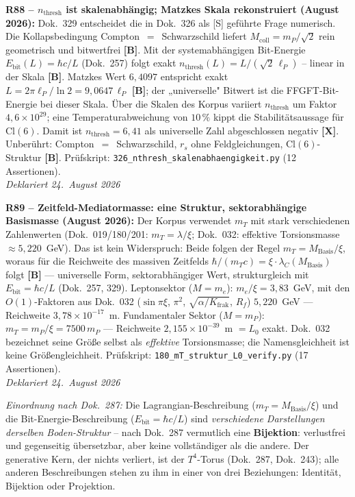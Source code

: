 \textbf{R88 -- $n_{\mathrm{thresh}}$ ist skalenabhängig; Matzkes Skala rekonstruiert (August 2026):}
Dok.~329 entscheidet die in Dok.~326 als [S] geführte Frage numerisch.
Die Kollapsbedingung Compton~$=$~Schwarzschild liefert $M_{\mathrm{coll}} = m_P/\sqrt{2}$ rein geometrisch und bitwertfrei \textbf{[B]}.
Mit der systemabhängigen Bit-Energie $E_{\mathrm{bit}}(L) = \hbar c/L$ (Dok.~257) folgt exakt $n_{\mathrm{thresh}}(L) = L/(\sqrt{2}\,\ell_P)$ -- linear in der Skala \textbf{[B]}.
Matzkes Wert $6{,}4097$ entspricht exakt $L = 2\pi\ell_P/\ln 2 = 9{,}0647\,\ell_P$ \textbf{[B]}; der „universelle" Bitwert ist die FFGFT-Bit-Energie bei dieser Skala.
Über die Skalen des Korpus variiert $n_{\mathrm{thresh}}$ um Faktor $4{,}6\times10^{29}$; eine Temperaturabweichung von $10\,\%$ kippt die Stabilitätsaussage für $\mathrm{Cl}(6)$.
Damit ist $n_{\mathrm{thresh}} = 6{,}41$ als universelle Zahl abgeschlossen negativ \textbf{[X]}.
Unberührt: Compton~$=$~Schwarzschild, $r_s$ ohne Feldgleichungen, $\mathrm{Cl}(6)$-Struktur \textbf{[B]}.
Prüfskript: \texttt{326\_nthresh\_skalenabhaengigkeit.py} (12 Assertionen).\\
\emph{Deklariert 24.~August 2026}

\medskip

\textbf{R89 -- Zeitfeld-Mediatormasse: eine Struktur, sektorabh\"angige Basismasse (August 2026):}
Der Korpus verwendet $m_T$ mit stark verschiedenen Zahlenwerten (Dok.~019/180/201: $m_T = \lambda/\xi$; Dok.~032: effektive Torsionsmasse $\approx 5{,}220$~GeV). Das ist kein Widerspruch: Beide folgen der Regel $m_T = M_\mathrm{Basis}/\xi$, woraus f\"ur die Reichweite des massiven Zeitfelds $\hbar/(m_T c) = \xi\cdot\lambda_C(M_\mathrm{Basis})$ folgt \textbf{[B]} --- universelle Form, sektorabh\"angiger Wert, strukturgleich mit $E_\mathrm{bit} = \hbar c/L$ (Dok.~257, 329).
Leptonsektor ($M = m_e$): $m_e/\xi = 3{,}83$~GeV, mit den $O(1)$-Faktoren aus Dok.~032 ($\sin\pi\xi$, $\pi^2$, $\sqrt{\alpha/K_\mathrm{frak}}$, $R_f$) $5{,}220$~GeV --- Reichweite $3{,}78\times10^{-17}$~m.
Fundamentaler Sektor ($M = m_P$): $m_T = m_P/\xi = 7500\,m_P$ --- Reichweite $2{,}155\times10^{-39}$~m $= L_0$ exakt.
Dok.~032 bezeichnet seine Gr\"o\ss{}e selbst als \emph{effektive} Torsionsmasse; die Namensgleichheit ist keine Gr\"o\ss{}engleichheit.
Pr\"ufskript: \texttt{180\_mT\_struktur\_L0\_verify.py} (17 Assertionen).\\
\emph{Deklariert 24.~August 2026}

\medskip

\noindent\textit{Einordnung nach Dok.~287:} Die Lagrangian-Beschreibung
($m_T = M_\mathrm{Basis}/\xi$) und die Bit-Energie-Beschreibung
($E_\mathrm{bit} = \hbar c/L$) sind \emph{verschiedene Darstellungen derselben
Boden-Struktur} -- nach Dok.~287 vermutlich eine \textbf{Bijektion}: verlustfrei
und gegenseitig \"ubersetzbar, aber keine vollst\"andiger als die andere.
Der generative Kern, der nichts verliert, ist der $T^4$-Torus (Dok.~287, Dok.~243);
alle anderen Beschreibungen stehen zu ihm in einer von drei Beziehungen:
Identit\"at, Bijektion oder Projektion.

